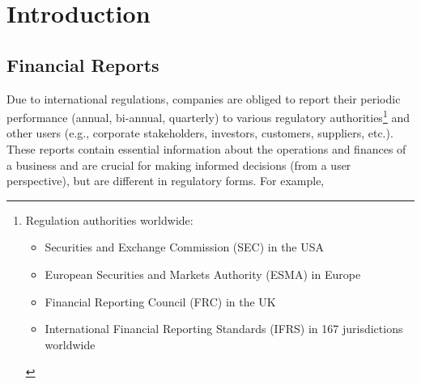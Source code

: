 \section{Introduction}\label{sec:introduction}

\subsection{Financial Reports} \label{subsec:financial_reports}
Due to international regulations, companies are obliged to report their periodic performance (annual, bi-annual, quarterly) to various regulatory authorities\footnote{Regulation authorities worldwide:
    \begin{itemize}
        \item Securities and Exchange Commission (SEC) in the USA
        \item European Securities and Markets Authority (ESMA) in Europe
        \item Financial Reporting Council (FRC) in the UK
        \item International Financial Reporting Standards (IFRS) in 167 jurisdictions worldwide
    \end{itemize}
    } and other users (e.g., corporate stakeholders, investors, customers, suppliers, etc.).
    These reports contain essential information about the operations and finances of a business and are crucial for making informed decisions (from a user perspective), but are different in regulatory forms.
    For example,
